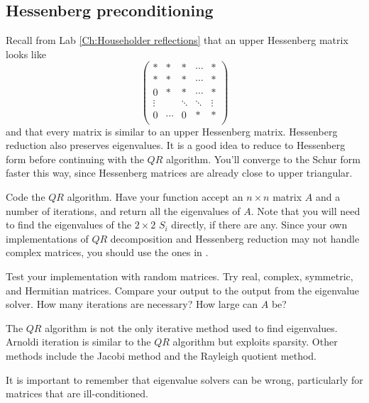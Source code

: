 \subsection*{Hessenberg preconditioning}

Recall from Lab \ref{Ch:Householder reflections} that an upper Hessenberg matrix looks like
\[
\begin{pmatrix}
*           & * & \ast & \cdots   & *\\
*           & * & * & \cdots   & * \\
0          & * & * &  \cdots&* \\
\vdots &  & \ddots    & \ddots & \vdots \\
0 & \cdots & 0 & * & *\\
\end{pmatrix} 
\]
and that every matrix is similar to an upper Hessenberg matrix. Hessenberg reduction also preserves eigenvalues. It is a good idea to reduce to Hessenberg form before continuing with the $QR$ algorithm. You'll converge to the Schur form faster this way, since Hessenberg matrices are already close to upper triangular.

\begin{problem}
Code the $QR$ algorithm. Have your function accept an $n \times n$ matrix $A$ and a number of iterations, and return all the eigenvalues of $A$. Note that you will need to find the eigenvalues of the $2 \times 2$ $S_i$ directly, if there are any. Since your own implementations of $QR$ decomposition and Hessenberg reduction may not handle complex matrices, you should use the ones in .
\end{problem}

\begin{comment}

\begin{problem}
If $A$ is normal, its Schur form is diagonal. For normal $A$, have your function additionally output the eigenvector corresponding to each eigenvalue. Hint 1: Test your function on Hermitian and real symmetric matrices; they are both normal. Hint 2: Your work in Problem \ref{problem:similarity proof} will help. You have already made all the necessary calculations, you just need to store the information correctly.
\end{problem}

\end{comment}

\begin{problem}
Test your implementation with random matrices. Try real, complex, symmetric, and Hermitian matrices. Compare your output to the output from the eigenvalue solver. How many iterations are necessary? How large can $A$ be?
\end{problem}

The $QR$ algorithm is not the only iterative method used to find eigenvalues. Arnoldi iteration is similar to the $QR$ algorithm but exploits sparsity. Other methods include the Jacobi method and the Rayleigh quotient method.

It is important to remember that eigenvalue solvers can be wrong, particularly for matrices that are ill-conditioned. 